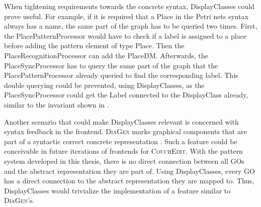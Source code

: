 When tightening requirements towards the concrete syntax, DisplayClasses could prove useful. For example, if it is required that a Place in the Petri nets syntax always has a name, the same part of the graph has to be queried two times. First, the PlacePatternProcessor would have to check if a label is assigned to a place before adding the pattern element of type Place. Then the PlaceRecognitionProcessor can add the PlaceDM. Afterwards, the PlaceSyncProcessor has to query the same part of the graph that the PlacePatternProcessor already queried to find the corresponding label. This double querying could be prevented, using DisplayClasses, as the PlaceSyncProcessor could get the Label connected to the DisplayClass already, similar to the invariant shown in .

Another scenario that could make DisplayClasses relevant is concerned with syntax feedback in the frontend. \textsc{DiaGen} marks graphical components that are part of a syntactic correct concrete representation \cite{minas_concepts_2002}. Such a feature could be conceivable in future iterations of frontends for \textsc{CouchEdit}. With the pattern system developed in this thesis, there is no direct connection between all GOs and the abstract representation they are part of. Using DisplayClasses, every GO has a direct connection to the abstract representation they are mapped to. Thus, DisplayClasses would trivialize the implementation of a feature similar to \textsc{DiaGen}'s.



